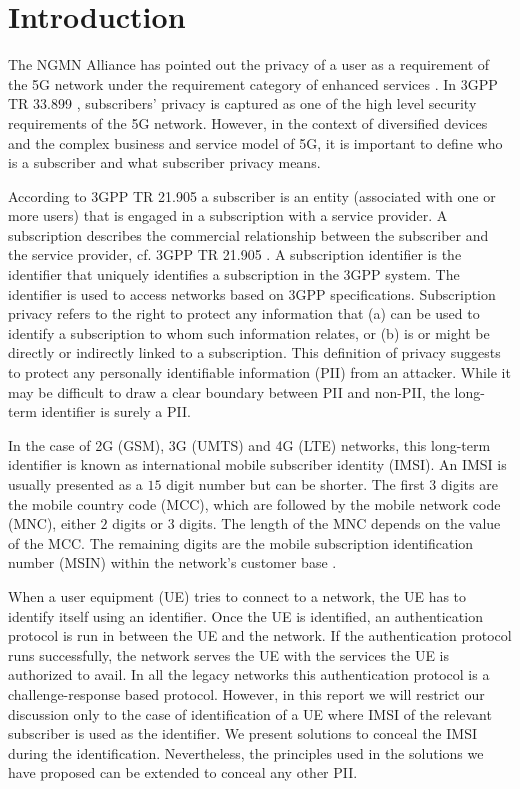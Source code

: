 \documentclass[12pt]{llncs}
\begin{document}
\section{Introduction}
\label{intro} The NGMN Alliance has pointed out the privacy of a user as a requirement of the 5G network under the requirement category of enhanced services \cite{NGMN_white_paper}. In 3GPP TR 33.899 \cite{TR33899}, subscribers' privacy is captured as one of the high level security requirements of the 5G network. However, in the context of diversified devices and the complex business and service model of 5G, it is important to define who is a subscriber and what subscriber privacy means. 

According to 3GPP TR 21.905 \cite{TR21905} a subscriber is an entity (associated with one or more users) that is engaged in a subscription with a service provider. A subscription describes the commercial relationship between the subscriber and the service provider, cf. 3GPP TR 21.905 \cite{TR21905}. A subscription identifier is the identifier that uniquely identifies a subscription in the 3GPP system. The identifier is used to access networks based on 3GPP specifications. Subscription privacy refers to the right to protect any information that (a) can be used to identify a subscription to whom such information relates, or (b) is or might be directly or indirectly linked to a subscription. This definition of privacy suggests to protect any personally identifiable information (PII) from an attacker. While it may be difficult to draw a clear boundary between PII and non-PII, the long-term identifier is surely a PII. 

In the case of 2G (GSM), 3G (UMTS) and 4G (LTE) networks, this long-term identifier is known as international mobile subscriber identity (IMSI). An IMSI is usually presented as a $15$ digit number but can be shorter. The first $3$ digits are the mobile country code (MCC), which are followed by the mobile network code (MNC), either $2$ digits or $3$ digits. The length of the MNC depends on the value of the MCC. The remaining digits are the mobile subscription identification number (MSIN) within the network's customer base \cite{TS23003}. 

When a user equipment (UE) tries to connect to a network, the UE has to identify itself using an identifier. Once the UE is identified, an authentication protocol is run in between the UE and the network. If the authentication protocol runs successfully, the network serves the UE with the services the UE is authorized to avail. In all the legacy networks this authentication protocol is a challenge-response based protocol. However, in this report we will restrict our discussion only to the case of identification of a UE where IMSI of the relevant subscriber is used as the identifier. We present solutions to conceal the IMSI during the identification. Nevertheless, the principles used in the solutions we have proposed can be extended to conceal any other PII. 
\end{document}
